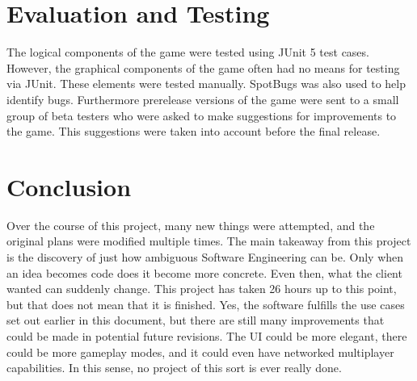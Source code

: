 \documentclass[12pt]{article}
\begin{document}
\section*{Evaluation and Testing}
The logical components of the game were tested using JUnit 5 test cases.  However, the graphical components of the game often had no means for testing via JUnit.  These elements were tested manually.  SpotBugs was also used to help identify bugs.  Furthermore prerelease versions of the game were sent to a small group of beta testers who were asked to make suggestions for improvements to the game.  This suggestions were taken into account before the final release.

\section*{Conclusion}
Over the course of this project, many new things were attempted, and the original plans were modified multiple times.  The main takeaway from this project is the discovery of just how ambiguous Software Engineering can be.  Only when an idea becomes code does it become more concrete.  Even then, what the client wanted can suddenly change.  This project has taken 26 hours up to this point, but that does not mean that it is finished.  Yes, the software fulfills the use cases set out earlier in this document, but there are still many improvements that could be made in potential future revisions.  The UI could be more elegant, there could be more gameplay modes, and it could even have networked multiplayer capabilities.  In this sense, no project of this sort is ever really done.
\end{document}
